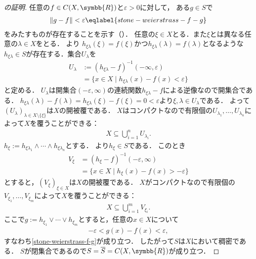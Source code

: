 \documentclass[../main.tex]{subfiles}
\begin{document}
\begin{proof}[の証明]
任意の\(f \in C(X, \symbb{R})\)と\(\varepsilon > 0\)に対して，
ある\(g \in S\)で
\begin{align}
    \lVert g - f \rVert < \varepsilon \eqlabel{stone-weierstrass-f-g}
\end{align}
をみたすものが存在することを示す（）．
任意の\(\xi \in X\)とる．また\(\xi\)とは異なる任意の\(\lambda \in X\)をとる．
より
\(h_{\xi\lambda}(\xi) = f(\xi)\)かつ\(h_{\xi\lambda}(\lambda) = f(\lambda)\)となるような\(h_{\xi\lambda} \in S\)が存在する．集合\(U_\lambda\)を
\begin{align*}
    U_{\lambda} &:= {(h_{\xi\lambda} - f)}^{-1}(-\infty, \varepsilon) \\
                &= \{ x \in X \mid h_{\xi\lambda}(x) - f(x) < \varepsilon \}
\end{align*}
と定める．
\(U_\lambda\)は開集合\((-\varepsilon, \infty)\)の連続関数\(h_{\xi\lambda} - f\)による逆像なので開集合である．
\(h_{\xi\lambda}(\lambda) - f(\lambda) = h_{\xi\lambda}(\xi) - f(\xi) = 0 < \varepsilon\)より\(\xi, \lambda \in U_\lambda\)である．
よって\((U_\lambda)_{\lambda \in X \setminus \{\xi\}}\)は\(X\)の開被覆である．
\(X\)はコンパクトなので有限個の\(U_{\lambda_1}, \ldots, U_{\lambda_n}\)によって\(X\)を覆うことができる：
\begin{align*}
    X \subseteq \bigcup_{i = 1}^n U_{\lambda_i}.
\end{align*}
\(h_\xi := h_{\xi\lambda_1} \land \cdots \land h_{\xi\lambda_n}\)とする．
より\(h_\xi \in S\)である．
このとき
\begin{align*}
    V_\xi &={(h_\xi - f)}^{-1}(-\varepsilon, \infty) \\
          &= \{ x \in X \mid h_{\xi}(x) - f(x) > - \varepsilon\}
\end{align*}
とすると，\((V_\xi)_{\xi \in X}\)は\(X\)の開被覆である．
\(X\)がコンパクトなので有限個の\(V_{\xi_1}, \ldots, V_{\xi_m}\)によって\(X\)を覆うことができる：
\begin{align*}
    X \subseteq \bigcup_{i = 1}^m V_{\xi_i}.
\end{align*}
ここで\(g := h_{\xi_1} \lor \cdots \lor h_{\xi_m}\)とすると，任意の\(x \in X\)について
\begin{align*}
    - \varepsilon < g(x) - f(x) < \varepsilon,
\end{align*}
すなわち\eqref{stone-weierstrass-f-g}が成り立つ．
したがって\(S\)は\(X\)において稠密である．
\(S\)が閉集合であるので\(S = \overline{S} = C(X, \symbb{R})\)が成り立つ．
\end{proof}
\end{document}
